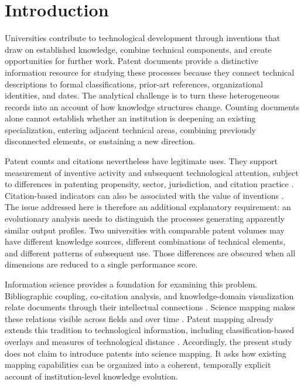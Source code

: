 \section{Introduction}\label{sec:introduction}
Universities contribute to technological development through inventions that draw
on established knowledge, combine technical components, and create opportunities
for further work. Patent documents provide a distinctive information resource for
studying these processes because they connect technical descriptions to formal
classifications, prior-art references, organizational identities, and dates. The
analytical challenge is to turn these heterogeneous records into an account of how
knowledge structures change. Counting documents alone cannot establish whether an
institution is deepening an existing specialization, entering adjacent technical
areas, combining previously disconnected elements, or sustaining a new direction.

Patent counts and citations nevertheless have legitimate uses. They support
measurement of inventive activity and subsequent technological attention, subject
to differences in patenting propensity, sector, jurisdiction, and citation practice
\citep{griliches1990,nagaoka2010,hall2005}. Citation-based indicators can also be
associated with the value of inventions \citep{trajtenberg1990}. The issue addressed
here is therefore an additional explanatory requirement: an evolutionary analysis
needs to distinguish the processes generating apparently similar output profiles.
Two universities with comparable patent volumes may have different knowledge
sources, different combinations of technical elements, and different patterns of
subsequent use. Those differences are obscured when all dimensions are reduced to
a single performance score.

Information science provides a foundation for examining this problem. Bibliographic
coupling, co-citation analysis, and knowledge-domain visualization relate documents
through their intellectual connections \citep{kessler1963,small1973,price1965,borner2003}.
Science mapping makes these relations visible across fields and over time
\citep{chen2006,vaneck2010,rafols2010}. Patent mapping already extends this tradition
to technological information, including classification-based overlays and measures
of technological distance \citep{kay2014,leydesdorff2014,yan2017}. Accordingly, the
present study does not claim to introduce patents into science mapping. It asks how
existing mapping capabilities can be organized into a coherent, temporally explicit
account of institution-level knowledge evolution.

